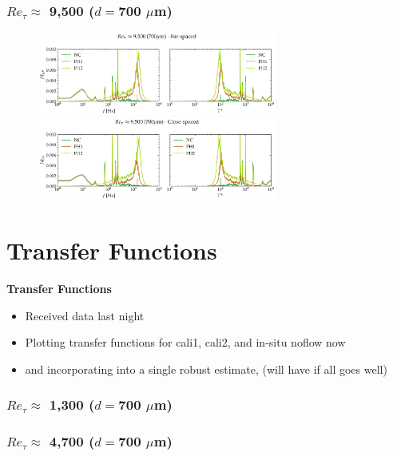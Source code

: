 \documentclass[aspectratio=169,9pt]{beamer}
\begin{document}
\begin{frame}
  \frametitle{$Re_\tau \approx$ 9,500 ($d=$700 $\mu$m)}
  \begin{figure}
    \centering
    \includegraphics[width=0.7\textwidth]{raw_spectra/700_100psi_raw_spec_far.png}
    \includegraphics[width=0.7\textwidth]{raw_spectra/700_100psi_raw_spec_close.png}
  \end{figure}
\end{frame}


\section{Transfer Functions}
\begin{frame}
  \centering
  \vfill
  {\Huge\bfseries \textcolor{cardinalred}{Transfer Functions}}
  \vfill

  \begin{itemize}
    \item Received data last night
    \item Plotting transfer functions for cali1, cali2, and in-situ noflow now
    \item and incorporating into a single robust estimate, (will have if all goes well)
  \end{itemize}
\end{frame}

\begin{frame}
  \frametitle{$Re_\tau\approx$ 1,300 ($d=$700 $\mu$m)}
\end{frame}

\begin{frame}
  \frametitle{$Re_\tau \approx$ 4,700 ($d=$700 $\mu$m)}
\end{frame}
\end{document}
